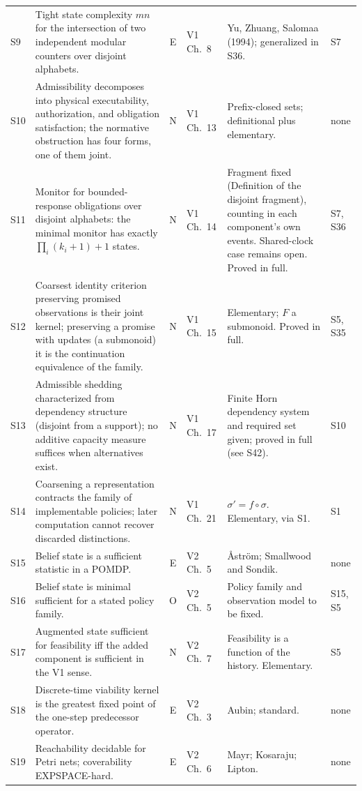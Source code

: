 \documentclass[10pt]{article}
\newcommand{\rep}{\sigma}
\begin{document}
\begin{longtable}{@{}l p{} c l p{} p{}@{}}
S9 & Tight state complexity $mn$ for the intersection of two independent modular counters over disjoint alphabets. & E & V1 Ch.~8 & Yu, Zhuang, Salomaa (1994); generalized in S36. & S7\\[3pt]
S10 & Admissibility decomposes into physical executability, authorization, and obligation satisfaction; the normative obstruction has four forms, one of them joint. & N & V1 Ch.~13 & Prefix-closed sets; definitional plus elementary. & none\\[3pt]
S11 & Monitor for bounded-response obligations over disjoint alphabets: the minimal monitor has exactly $\prod_i(k_i+1)+1$ states. & N & V1 Ch.~14 & Fragment fixed (Definition of the disjoint fragment), counting in each component's own events. Shared-clock case remains open. Proved in full. & S7, S36\\[3pt]
S12 & Coarsest identity criterion preserving promised observations is their joint kernel; preserving a promise with updates (a submonoid) it is the continuation equivalence of the family. & N & V1 Ch.~15 & Elementary; $F$ a submonoid. Proved in full. & S5, S35\\[3pt]
S13 & Admissible shedding characterized from dependency structure (disjoint from a support); no additive capacity measure suffices when alternatives exist. & N & V1 Ch.~17 & Finite Horn dependency system and required set given; proved in full (see S42). & S10\\[3pt]
S14 & Coarsening a representation contracts the family of implementable policies; later computation cannot recover discarded distinctions. & N & V1 Ch.~21 & $\rep'=f\circ\rep$. Elementary, via S1. & S1\\[3pt]
S15 & Belief state is a sufficient statistic in a POMDP. & E & V2 Ch.~5 & \r{A}str\"om; Smallwood and Sondik. & none\\[3pt]
S16 & Belief state is minimal sufficient for a stated policy family. & O & V2 Ch.~5 & Policy family and observation model to be fixed. & S15, S5\\[3pt]
S17 & Augmented state sufficient for feasibility iff the added component is sufficient in the V1 sense. & N & V2 Ch.~7 & Feasibility is a function of the history. Elementary. & S5\\[3pt]
S18 & Discrete-time viability kernel is the greatest fixed point of the one-step predecessor operator. & E & V2 Ch.~3 & Aubin; standard. & none\\[3pt]
S19 & Reachability decidable for Petri nets; coverability EXPSPACE-hard. & E & V2 Ch.~6 & Mayr; Kosaraju; Lipton. & none\\[3pt]

\end{longtable}
\end{document}
